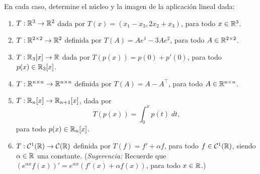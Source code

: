 \documentclass[a4,11pt]{aleph-notas}
\begin{document}
\begin{ejer}
    En cada caso, determine el núcleo y la imagen de la aplicación lineal dada:
    \begin{enumerate}
        \item $T:\mathbb{R}^3\to\mathbb{R}^2$ dada por $T(x) = (x_1-x_3,2x_2+x_3)$, para todo $x\in\mathbb{R}^3$.
        \item $T:\mathbb{R}^{2\times 2} \to \mathbb{R}^2$ definida por $T(A)=Ae^{1} - 3Ae^2$, para todo $A\in\mathbb{R}^{2\times 2}$.
        \item $T:\mathbb{R}_3[x]\to \mathbb{R}$ dada por $T(p(x))=p(0) + p'(0)$, para todo $p(x)\in\mathbb{R}_3[x]$.
        \item $T:\mathbb{R}^{n\times n}\to \mathbb{R}^{n\times n}$ definida por $T(A)=A-A^\intercal$, para todo $A\in\mathbb{R}^{n\times n}$.
        \item $T:\mathbb{R}_n[x]\to \mathbb{R}_{n+1}[x]$, dada por
        \[
            T(p(x)) = \int_0^x p(t)\; dt,
        \]
        para todo $p(x)\in \mathbb{R}_n[x]$.
        \item $T:\mathcal{C}^1(\mathbb{R})\to\mathcal{C}(\mathbb{R})$ definida por $T(f)=f' + \alpha f$, para todo $f\in\mathcal{C}^1(\mathbb{R})$, siendo $\alpha\in \mathbb{R}$ una constante. (\emph{Sugerencia:} Recuerde que $(e^{\alpha x}f(x))' = e^{\alpha x}(f'(x) + \alpha f(x))$, para todo $x\in\mathbb{R}$.)
    \end{enumerate}
\end{ejer}
\end{document}
